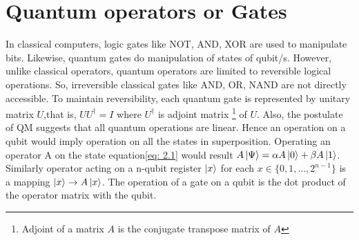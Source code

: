 \section{Quantum operators or Gates}
In classical computers, logic gates like NOT, AND, XOR are used to manipulate bits. Likewise, quantum gates do manipulation of states of qubit/s. However, unlike classical operators, quantum operators are limited to reversible logical operations. So, irreversible classical gates like AND, OR, NAND are not directly accessible.  To maintain reversibility, each  quantum gate is represented by unitary matrix $U$,that is, $UU^{\dag} =I$ where $U^{\dag}$ is adjoint matrix \footnote{Adjoint of a matrix $A$ is the conjugate transpose matrix of $A$} of $U$. Also, the postulate of QM suggests that all quantum operations are linear. Hence an operation on a qubit would imply operation on all the states in superposition. Operating an operator A on the state equation\eqref{eq: 2.1} would result $A\ket{\Psi} = \alpha A\ket{0} + \beta A\ket{1}$. Similarly operator acting on a n-qubit register $\ket{x}$ for each $x\in \{0,1,..., 2^{n-1} \}$ is a mapping $\ket{x} \to A\ket{x}$.\cite{Cheung} The operation of a gate on a qubit is the dot product of the operator matrix with the qubit.

